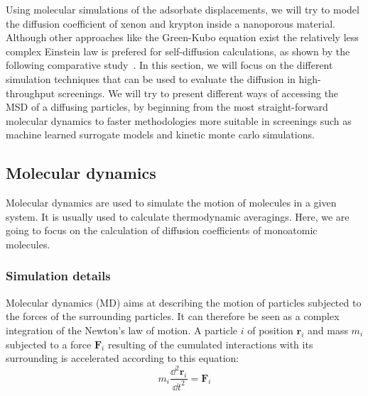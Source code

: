 \documentclass[main]{subfiles}
\begin{document}
Using molecular simulations of the adsorbate displacements, we will try to model the diffusion coefficient of xenon and krypton inside a nanoporous material. Although other approaches like the Green-Kubo equation exist the relatively less complex Einstein law is prefered for self-diffusion calculations, as shown by the following comparative study~\cite{Maginn_2020}. In this section, we will focus on the different simulation techniques that can be used to evaluate the diffusion in high-throughput screenings. We will try to present different ways of accessing the MSD of a diffusing particles, by beginning from the most straight-forward molecular dynamics to faster methodologies more suitable in screenings such as machine learned surrogate models and kinetic monte carlo simulations.


\subsection{Molecular dynamics}

Molecular dynamics are used to simulate the motion of molecules in a given system. It is usually used to calculate thermodynamic averagings. Here, we are going to focus on the calculation of diffusion coefficients of monoatomic molecules.

\subsubsection{Simulation details}

Molecular dynamics (MD) aims at describing the motion of particles subjected to the forces of the surrounding particles. It can therefore be seen as a complex integration of the Newton's law of motion. A particle $i$ of position $\mathbf{r}_i$ and mass $m_i$ subjected to a force $\mathbf{F}_i$ resulting of the cumulated interactions with its surrounding is accelerated according to this equation:
\begin{equation}\label{eq:newton}
  m_i\frac{\dd^2 \mathbf{r}_i}{{\dd t}^2} = \mathbf{F}_i
\end{equation}
\end{document}
